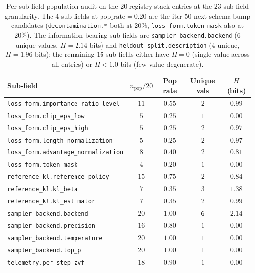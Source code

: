\documentclass{article}
\begin{document}
\begin{table}[t]
\centering
\small
\caption{Per-sub-field population audit on the $20$ registry stack
entries at the $23$-sub-field granularity. The $4$ sub-fields at
$\mathrm{pop\_rate}=0.20$ are the iter-50 next-schema-bump candidates
(\texttt{decontamination.*} both at $20\%$, \texttt{loss\_form.token\_mask}
also at $20\%$). The information-bearing sub-fields are
\texttt{sampler\_backend.backend} ($6$ unique values, $H = 2.14$ bits) and
\texttt{heldout\_split.description} ($4$ unique, $H = 1.96$ bits); the
remaining $16$ sub-fields either have $H = 0$ (single value across
all entries) or $H < 1.0$ bits (few-value degenerate).}
\label{tab:p6-minreport-subfield}
\begin{tabular}{lcccc}
\toprule
Sub-field & $n_{\text{pop}}/20$ & Pop rate & Unique vals & $H$ (bits) \\
\midrule
\texttt{loss\_form.importance\_ratio\_level}  & $11$ & $0.55$ & $2$ & $0.99$ \\
\texttt{loss\_form.clip\_eps\_low}             & $5$  & $0.25$ & $1$ & $0.00$ \\
\texttt{loss\_form.clip\_eps\_high}            & $5$  & $0.25$ & $2$ & $0.97$ \\
\texttt{loss\_form.length\_normalization}     & $5$  & $0.25$ & $2$ & $0.97$ \\
\texttt{loss\_form.advantage\_normalization}  & $8$  & $0.40$ & $2$ & $0.81$ \\
\texttt{loss\_form.token\_mask}                & $4$  & $\mathbf{0.20}$ & $1$ & $0.00$ \\
\texttt{reference\_kl.reference\_policy}      & $15$ & $0.75$ & $2$ & $0.84$ \\
\texttt{reference\_kl.kl\_beta}                & $7$  & $0.35$ & $3$ & $1.38$ \\
\texttt{reference\_kl.kl\_estimator}           & $7$  & $0.35$ & $2$ & $0.99$ \\
\texttt{sampler\_backend.backend}             & $20$ & $1.00$ & $\mathbf{6}$ & $\mathbf{2.14}$ \\
\texttt{sampler\_backend.precision}           & $16$ & $0.80$ & $1$ & $0.00$ \\
\texttt{sampler\_backend.temperature}         & $20$ & $1.00$ & $1$ & $0.00$ \\
\texttt{sampler\_backend.top\_p}               & $20$ & $1.00$ & $1$ & $0.00$ \\
\texttt{telemetry.per\_step\_zvf}             & $18$ & $0.90$ & $1$ & $0.00$ \\

\end{tabular}
\end{table}
\end{document}
